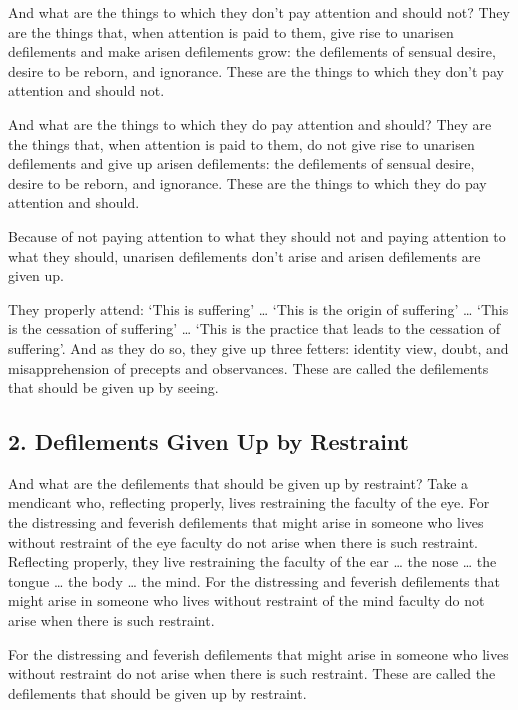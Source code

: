 \documentclass[12pt,openany]{book}%
\begin{document}
And what are the things to which they don’t pay attention and should not? They are the things that, when attention is paid to them, give rise to unarisen defilements and make arisen defilements grow: the defilements of sensual desire, desire to be reborn, and ignorance. These are the things to which they don’t pay attention and should not. 

And what are the things to which they do pay attention and should? They are the things that, when attention is paid to them, do not give rise to unarisen defilements and give up arisen defilements: the defilements of sensual desire, desire to be reborn, and ignorance. These are the things to which they do pay attention and should. 

Because of not paying attention to what they should not and paying attention to what they should, unarisen defilements don’t arise and arisen defilements are given up. 

They properly attend: ‘This is suffering’ … ‘This is the origin of suffering’ … ‘This is the cessation of suffering’ … ‘This is the practice that leads to the cessation of suffering’. And as they do so, they give up three fetters: identity view, doubt, and misapprehension of precepts and observances. These are called the defilements that should be given up by seeing. 

\subsection*{2. Defilements Given Up by Restraint }

And what are the defilements that should be given up by restraint? Take a mendicant who, reflecting properly, lives restraining the faculty of the eye. For the distressing and feverish defilements that might arise in someone who lives without restraint of the eye faculty do not arise when there is such restraint. Reflecting properly, they live restraining the faculty of the ear … the nose … the tongue … the body … the mind. For the distressing and feverish defilements that might arise in someone who lives without restraint of the mind faculty do not arise when there is such restraint. 

For the distressing and feverish defilements that might arise in someone who lives without restraint do not arise when there is such restraint. These are called the defilements that should be given up by restraint. 
\end{document}

